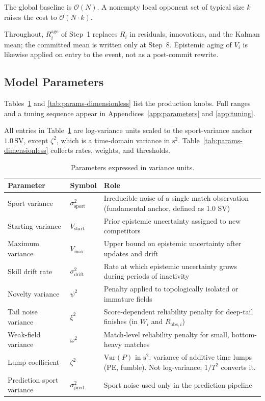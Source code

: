 \documentclass[12pt]{article}
\newcommand{\ssport}{\sigma_{\mathrm{sport}}^2}      %
\newcommand{\vstart}{V_{\mathrm{start}}}
\newcommand{\vmax}{V_{\mathrm{max}}}
\newcommand{\sdrift}{\sigma_{\mathrm{drift}}^2}
\newcommand{\psii}{\psi^2}
\newcommand{\xii}{\xi^2}
\newcommand{\omegai}{\omega^2}
\newcommand{\zetai}{\zeta^2}                    %
\newcommand{\spred}{\sigma_{\mathrm{pred}}^2}
\begin{document}
	The global baseline is $\mathcal{O}(N)$. A nonempty local opponent set of typical size $k$ raises the cost to $\mathcal{O}(N\cdot k)$.

	Throughout, $R_i^{\mathrm{age}}$ of Step~1 replaces $R_i$ in residuals, innovations, and the Kalman mean; the committed mean is written only at Step~8. Epistemic aging of $V_i$ is likewise applied on entry to the event, not as a post-commit rewrite.

	\subsection{Model Parameters}
	Tables~\ref{tab:params-variance} and \ref{tab:params-dimensionless} list the production knobs. Full ranges and a tuning sequence appear in Appendices~\ref{app:parameters} and \ref{app:tuning}.

	All entries in Table~\ref{tab:params-variance} are log-variance units scaled to the sport-variance anchor $1.0\,\mathrm{SV}$, except \(\zetai\), which is a time-domain variance in $\mathrm{s}^2$. Table~\ref{tab:params-dimensionless} collects rates, weights, and thresholds.

	\begin{table}[htbp]
		\centering
		\caption{Parameters expressed in variance units.}
		\label{tab:params-variance}
		\begin{tabular}{llp{7cm}}
			\toprule
			\textbf{Parameter} & \textbf{Symbol} & \textbf{Role} \\
			\midrule
			Sport variance & \(\ssport\) & Irreducible noise of a single match observation (fundamental anchor, defined as 1.0 SV) \\
			Starting variance & \(\vstart\) & Prior epistemic uncertainty assigned to new competitors \\
			Maximum variance & \(\vmax\) & Upper bound on epistemic uncertainty after updates and drift \\
			Skill drift rate & \(\sdrift\) & Rate at which epistemic uncertainty grows during periods of inactivity \\
			Novelty variance & \(\psii\) & Penalty applied to topologically isolated or immature fields \\
			Tail noise variance & \(\xii\) & Score-dependent reliability penalty for deep-tail finishes (in \(W_i\) and \(R_{\mathrm{obs},i}\)) \\
			Weak-field variance & \(\omegai\) & Match-level reliability penalty for small, bottom-heavy matches \\
			Lump coefficient & \(\zetai\) & $\mathrm{Var}(P)$ in $\mathrm{s}^2$: variance of additive time lumps (PE, fumble). Not log-variance; $1/T^2$ converts it. \\
			Prediction sport variance & \(\spred\) & Sport noise used only in the prediction pipeline \\
			\bottomrule
		\end{tabular}
	\end{table}
\end{document}
